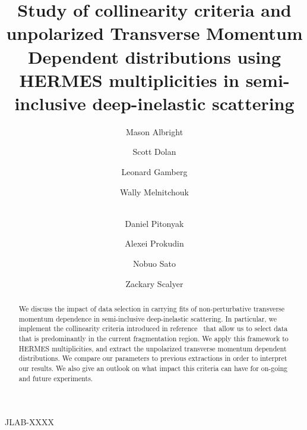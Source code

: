 \documentclass[final,3p,times,onecolumn,sort&compress,hidelinks]{elsarticle}
\newcommand\3[1]{\boldsymbol{#1}}
\newcommand*{\FigPath}{../Figs/}%
\begin{document}
\begin{flushleft}
\end{flushleft}
\vspace{-3.0cm}
\begin{flushright}
JLAB-XXXX
\vspace{0.5cm}
\end{flushright}

\begin{frontmatter}

\author{Mason Albright}
\author{Scott Dolan}
\author{Leonard Gamberg}
\author{Wally Melnitchouk}
\author{\\Daniel Pitonyak}
\author{Alexei Prokudin} 
\author{Nobuo Sato}
\author{Zackary  Scalyer}
\address[label1]{College of Engineering, Penn State University, State College, Pennsylvania 16801, USA}
\address[label4]{Dipartimento di Fisica Teorica, Universit$\grave{a}$ di Torino, Via P. Giuria 1, I-10125 Torino, Italy}
\address[label5]{Dipartimento di Fisica, Universit$\grave{a}$ di Cagliari, Cittadella Universitaria, I-09042 Monserrato
(CA), Italy}
\address[label2]{Division of Science, Penn State University Berks, Reading, Pennsylvania 19610, USA}
\address[label3]{Theory Center, Jefferson Lab, 12000 Jefferson Avenue, Newport News, Virginia 23606, USA}
\address[label4]{?}


\title{Study of collinearity criteria and unpolarized Transverse Momentum Dependent distributions using HERMES multiplicities in semi-inclusive deep-inelastic scattering}


\begin{abstract}

   We discuss the impact of data selection in carrying  fits of 
    non-perturbative transverse momentum dependence in semi-inclusive deep-inelastic scattering. In particular, we implement the  collinearity criteria introduced in reference~\cite{Boglione:2016bph} that allow us to select data  that is  predominantly in the current fragmentation region.  We apply this framework to HERMES multiplicities, and extract  the unpolarized transverse momentum dependent distributions.    We compare our parameters to previous extractions in order to interpret our results.  We also give an outlook on what impact this criteria can have for on-going and future experiments.
\end{abstract}




\end{frontmatter}
\end{document}
